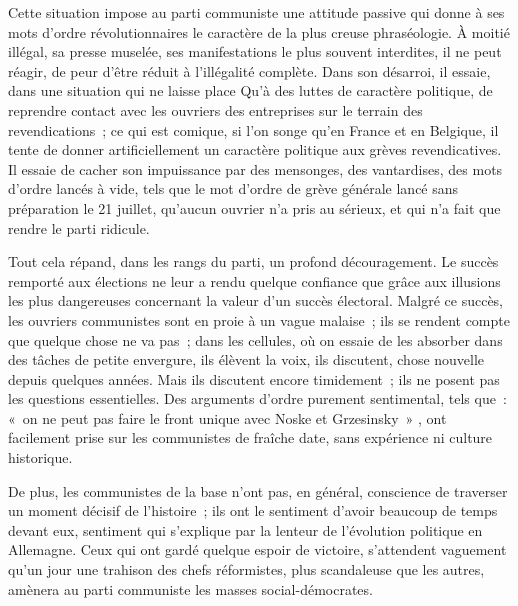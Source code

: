 \documentclass[french,twoside]{book} %
\begin{document}
\noindent Cette situation impose au parti communiste une attitude passive qui donne à ses mots d'ordre révolutionnaires le caractère de la plus creuse phraséologie. À moitié illégal, sa presse muselée, ses manifestations le plus souvent inter­dites, il ne peut réagir, de peur d'être réduit à l'illégalité complète. Dans son désarroi, il essaie, dans une situation qui ne laisse place Qu'à des luttes de caractère politique, de reprendre contact avec les ouvriers des entreprises sur le terrain des revendications ; ce qui est comique, si l'on songe qu'en France et en Belgique, il tente de donner artificiellement un caractère politique aux grèves revendicatives. Il essaie de cacher son impuissance par des mensonges, des vantardises, des mots d'ordre lancés à vide, tels que le mot d'ordre de grève générale lancé sans préparation le 21 juillet, qu'aucun ouvrier n'a pris au sérieux, et qui n'a fait que rendre le parti ridicule.\par
Tout cela répand, dans les rangs du parti, un profond découragement. Le succès remporté aux élections ne leur a rendu quelque confiance que grâce aux illusions les plus dangereuses concernant la valeur d'un succès électoral. Malgré ce succès, les ouvriers communistes sont en proie à un vague malaise ; ils se rendent compte que quelque chose ne va pas ; dans les cellules, où on essaie de les absorber dans des tâches de petite envergure, ils élèvent la voix, ils discutent, chose nouvelle depuis quelques années. Mais ils discutent encore timidement ; ils ne posent pas les questions essentielles. Des arguments d'ordre purement sentimental, tels que : « on ne peut pas faire le front unique avec Noske et Grzesinsky » , ont facilement prise sur les communistes de fraîche date, sans expérience ni culture historique.\par
De plus, les communistes de la base n'ont pas, en général, conscience de traverser un moment décisif de l'histoire ; ils ont le sentiment d'avoir beau­coup de temps devant eux, sentiment qui s'explique par la lenteur de l'évolu­tion politique en Allemagne. Ceux qui ont gardé quelque espoir de victoire, s'attendent vaguement qu'un jour une trahison des chefs réformistes, plus scandaleuse que les autres, amènera au parti communiste les masses social-démocrates.\par
\end{document}
